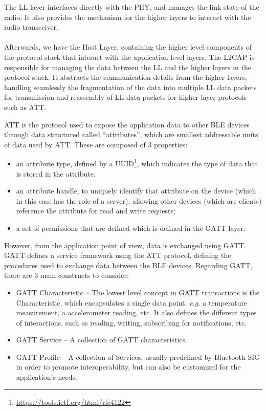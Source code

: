 The \acf{LL} layer interfaces directly with the \acs{PHY}, and manages the link state of the radio. It also provides the mechanism for the higher layers to interact with the radio transceiver. 

\paragraph{} Afterwards, we have the Host Layer, containing the higher level components of the protocol stack that interact with the application level layers. The \acs{L2CAP} is responsible for managing the data between the \acs{LL} and the higher layers in the protocol stack. It abstracts the communication details from the higher layers, handling seamlessly the fragmentation of the data into multiple \acs{LL} data packets for transmission and reassembly of \acs{LL} data packets for higher layer protocols such as \acf{ATT}.

\acs{ATT} is the protocol used to expose the application data to other \acs{BLE} devices through data structured called ``attributes'', which are smallest addressable units of data used by \acs{ATT}. These are composed of 3 properties: 

\begin{itemize}
    \item an attribute type, defined by a \acf{UUID}\footnote{\url{https://tools.ietf.org/html/rfc4122}}, which indicates the type of data that is stored in the attribute.
    \item an attribute handle, to uniquely identify that attribute on the device (which in this case has the role of a server), allowing other devices (which are clients) reference the attribute for read and write requests;
    \item a set of permissions that are defined which is defined in the \acf{GATT} layer.
\end{itemize}

However, from the application point of view, data is exchanged using \acf{GATT}. \acs{GATT} defines a service framework using the \acs{ATT} protocol, defining the procedures used to exchange data between the \acs{BLE} devices. Regarding \acs{GATT}, there are 3 main constructs to consider:

\begin{itemize}
    \item \acs{GATT} Characteristic -- The lowest level concept in \acs{GATT} transactions is the Characteristic, which encapsulates a single data point, \textit{e.g.} a temperature measurement, a accelerometer reading, etc. It also defines the different types of interactions, such as reading, writing, subscribing for notifications, etc.
    \item \acs{GATT} Service -- A collection of \acs{GATT} characteristics.
    \item \acs{GATT} Profile -- A collection of Services, usually predefined by Bluetooth SIG in order to promote interoperability, but can also be customized for the application's needs.
\end{itemize}

